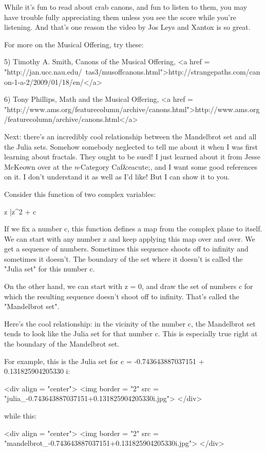 While it's fun to read about crab canons, and fun to listen to them, 
you may have trouble fully appreciating them unless you see the score
while you're listening.  And that's one reason the video by Jos Leys
and Xantox is so great.  

For more on the Musical Offering, try these:

5) Timothy A. Smith, Canons of the Musical Offering, 
<a href = "http://jan.ucc.nau.edu/~tas3/musoffcanons.html">http://strangepaths.com/canon-1-a-2/2009/01/18/en/</a>

6) Tony Phillips, Math and the Musical Offering,
<a href = "http://www.ams.org/featurecolumn/archive/canons.html">http://www.ams.org/featurecolumn/archive/canons.html</a>

Next: there's an incredibly cool relationship between the Mandelbrot
set and all the Julia sets.  Somehow somebody neglected to tell me
about it when I was first learning about fractals.  They ought to be 
sued!  I just learned about it from Jesse McKeown over at the
\emph{n}-Category Caf&eacute;, and I want some good references on it.  
I don't understand it as well as I'd like!  But I can show it to you.

Consider this function of two complex variables:

z |\to  z^{2} + c

If we fix a number c, this function defines a map from the complex
plane to itself.  We can start with any number z and keep applying
this map over and over.  We get a sequence of numbers.  Sometimes this
sequence shoots off to infinity and sometimes it doesn't.  The 
boundary of the set where it doesn't is called the "Julia set" for 
this number c.

On the other hand, we can start with z = 0, and draw the set of
numbers c for which the resulting sequence doesn't shoot off to
infinity.  That's called the "Mandelbrot set".

Here's the cool relationship: in the vicinity of the number c, the
Mandelbrot set tends to look like the Julia set for that number c.
This is especially true right at the boundary of the Mandelbrot set.

For example, this is the Julia set for c = -0.743643887037151 + 0.131825904205330 i:

<div align = "center">
<img border = "2" src = "julia_-0.743643887037151+0.131825904205330i.jpg">
</div>

while this:

<div align = "center">
<img border = "2" src = "mandelbrot_-0.743643887037151+0.131825904205330i.jpg">
</div>

